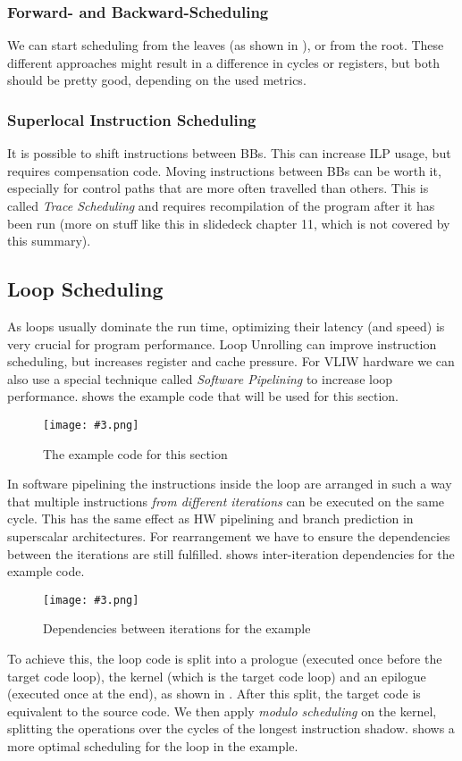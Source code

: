 \documentclass{article}
\newcommand{\fig}[4]{
	\begin{figure}[#1]
		\center
		\texttt{[image: \#3.png]}
		\caption{#4}
		\label{fig:#3}
	\end{figure}
	}
\begin{document}
\subsubsection{Forward- and Backward-Scheduling}
We can start scheduling from the leaves (as shown in ), or from the root.
These different approaches might result in a difference in cycles or registers, but both should be pretty good, depending on the used metrics.

\subsubsection{Superlocal Instruction Scheduling}
It is possible to shift instructions between BBs.
This can increase ILP usage, but requires compensation code.
Moving instructions between BBs can be worth it, especially for control paths that are more often travelled than others.
This is called \emph{Trace Scheduling} and requires recompilation of the program after it has been run (more on stuff like this in slidedeck chapter 11, which is not covered by this summary).

\subsection{Loop Scheduling}
As loops usually dominate the run time, optimizing their latency (and speed) is very crucial for program performance.
Loop Unrolling can improve instruction scheduling, but increases register and cache pressure.
For VLIW hardware we can also use a special technique called \emph{Software Pipelining} to increase loop performance.
 shows the example code that will be used for this section.

\fig{h}{}{softpipeline}{The example code for this section}

In software pipelining the instructions inside the loop are arranged in such a way that multiple instructions \emph{from different iterations} can be executed on the same cycle.
This has the same effect as HW pipelining and branch prediction in superscalar architectures.
For rearrangement we have to ensure the dependencies between the iterations are still fulfilled.
 shows inter-iteration dependencies for the example code.

\fig{h}{0.8}{dependencies}{Dependencies between iterations for the example}

To achieve this, the loop code is split into a prologue (executed once before the target code loop), the kernel (which is the target code loop) and an epilogue (executed once at the end), as shown in .
After this split, the target code is equivalent to the source code.
We then apply \emph{modulo scheduling} on the kernel, splitting the operations over the cycles of the longest instruction shadow.
 shows a more optimal scheduling for the loop in the example.
\end{document}
